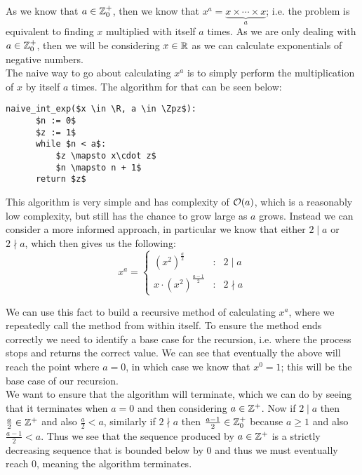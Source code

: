 As we know that \(a \in \mathbb{Z}^+_0\), then we know that \(x^a = \underbrace{x\times \cdots \times x}_a\); i.e. the problem is equivalent to finding \(x\) multiplied with itself \(a\) times. As we are only dealing with \(a \in \mathbb{Z}^+_0\), then we will be considering \(x \in \mathbb{R}\) as we can calculate exponentials of negative numbers.\\

The naive way to go about calculating \(x^a\) is to simply perform the multiplication of \(x\) by itself \(a\) times. The algorithm for that can be seen below:

\begin{lstlisting}[caption={Naive integer exponentiation},label={PCD_"Naive int exp"}]
  naive_int_exp($x \in \R, a \in \Zpz$):
      $n := 0$
      $z := 1$
      while $n < a$:
          $z \mapsto x\cdot z$
          $n \mapsto n + 1$
      return $z$
\end{lstlisting}

This algorithm is very simple and has complexity of \(\mathcal{O}(a)\), which is a reasonably low complexity, but still has the chance to grow large as \(a\) grows. Instead we can consider a more informed approach, in particular we know that either \(2 \mid a\) or \(2 \nmid a\), which then gives us the following:
\:
\begin{displaymath}
	x^a = \left\{\begin{array}{lcl}
		(x^2)^{\tfrac{a}{2}} & : & 2 \mid a\\
		x \cdot (x^2)^{\tfrac{a-1}{2}} & : & 2 \nmid a
	\end{array}\right.
\end{displaymath}

We can use this fact to build a recursive method of calculating \(x^a\), where we repeatedly call the method from within itself. To ensure the method ends correctly we need to identify a base case for the recursion, i.e. where the process stops and returns the correct value. We can see that eventually the above will reach the point where \(a = 0\), in which case we know that \(x^0 = 1\); this will be the base case of our recursion.\\

We want to ensure that the algorithm will terminate, which we can do by seeing that it terminates when \(a = 0\) and then considering \(a \in \mathbb{Z}^+\). Now if \(2 \mid a\) then \(\tfrac{a}{2} \in \mathbb{Z}^+\) and also \(\tfrac{a}{2} < a\), similarly if \(2 \nmid a\) then \(\tfrac{a-1}{2} \in \mathbb{Z}^+_0\) because \(a \ge 1\) and also \(\tfrac{a-1}{2} < a\). Thus we see that the sequence produced by \(a \in \mathbb{Z}^+\) is a strictly decreasing sequence that is bounded below by 0 and thus we must eventually reach 0, meaning the algorithm terminates.\\

